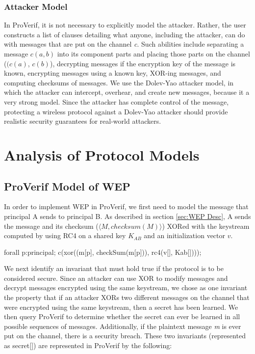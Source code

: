 \documentclass[11pt, twocolumn]{article} %
\begin{document}
{\subsubsection{Attacker Model}
In ProVerif, it is not necessary to explicitly model the attacker.  Rather, the user constructs a list of clauses detailing what anyone, including the attacker, can do with messages that are put on the channel \textit{c}.  Such abilities include separating a message $c(a,b)$ into its component parts and placing those parts on the channel ($(c(a)$, $c(b)$), decrypting messages if the encryption key of the message is known, encrypting messages using a known key, XOR-ing messages, and computing checksums of messages.  We use the Dolev-Yao attacker model, in which the attacker can intercept, overhear, and create new messages, because it a very strong model.  Since the attacker has complete control of the message, protecting a wireless protocol against a Dolev-Yao attacker should provide realistic security guarantees for real-world attackers. 

\section{Analysis of Protocol Models}
\label{sec:analysis}

\subsection{ProVerif Model of WEP}
In order to implement WEP in ProVerif, we first need to model the message that principal A sends to principal B.  As described in section \ref{sec:WEP Desc}, A sends the message and its checksum ($\langle M, checksum(M)\rangle$) XORed with the keystream computed by using RC4 on a shared key $K_{AB}$ and an initialization vector $v$. 
\begin{verbatimtab}[4]
forall p:principal; 
	c(xor((m[p], checkSum(m[p])), 
		rc4(v[], Kab[])));
\end{verbatimtab}


We next identify an invariant that must hold true if the protocol is to be considered secure.  Since an attacker can use XOR to modify messages and decrypt messages encrypted using the same keystream, we chose as one invariant the property that if an attacker XORs two different messages on the channel that were encrypted using the same keystream, then a secret has been learned.  We then query ProVerif to determine whether the secret can ever be learned in all possible sequences of messages.   Additionally, if the plaintext message \textit{m} is ever put on the channel, there is a security breach.  These two invariants (represented as secret[]) are represented in ProVerif by the following:

}
\end{document}
